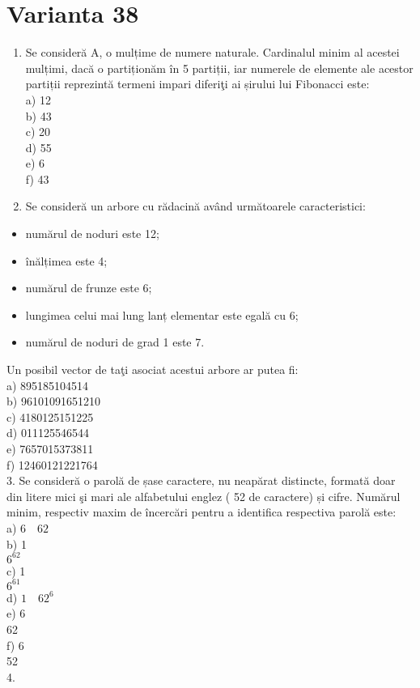 \section*{Varianta 38}
\begin{enumerate}
  \item Se consideră A, o mulțime de numere naturale. Cardinalul minim al acestei mulțimi, dacă o partiționăm în 5 partiții, iar numerele de elemente ale acestor partiții reprezintă termeni impari diferiţi ai șirului lui Fibonacci este:\\
a) 12\\
b) 43\\
c) 20\\
d) 55\\
e) 6\\
f) 43
  \item Se consideră un arbore cu rădacină având următoarele caracteristici:
\end{enumerate}

\begin{itemize}
  \item numărul de noduri este 12;
  \item înălțimea este 4;
  \item numărul de frunze este 6;
  \item lungimea celui mai lung lanț elementar este egală cu 6;
  \item numărul de noduri de grad 1 este 7.
\end{itemize}

Un posibil vector de taţi asociat acestui arbore ar putea fi:\\
a) 895185104514\\
b) 96101091651210\\
c) 4180125151225\\
d) 011125546544\\
e) 7657015373811\\
f) 12460121221764\\
3. Se consideră o parolă de șase caractere, nu neapărat distincte, formată doar din litere mici şi mari ale alfabetului englez ( 52 de caractere) și cifre. Numărul minim, respectiv maxim de încercări pentru a identifica respectiva parolă este:\\
a) $6 \quad 62$\\
b) 1\\
$6^{62}$\\
c) 1\\
$6^{61}$\\
d) $1 \quad 62^{6}$\\
e) 6\\
62\\
f) 6\\
52\\
4.

